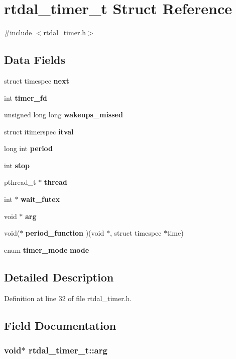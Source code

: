 \section{rtdal\-\_\-timer\-\_\-t Struct Reference}
\label{structrtdal__timer__t}


{\ttfamily \#include $<$rtdal\-\_\-timer.\-h$>$}

\subsection*{Data Fields}
\begin{DoxyCompactItemize}
\item 
struct timespec {\bf next}
\item 
int {\bf timer\-\_\-fd}
\item 
unsigned long long {\bf wakeups\-\_\-missed}
\item 
struct itimerspec {\bf itval}
\item 
long int {\bf period}
\item 
int {\bf stop}
\item 
pthread\-\_\-t $\ast$ {\bf thread}
\item 
int $\ast$ {\bf wait\-\_\-futex}
\item 
void $\ast$ {\bf arg}
\item 
void($\ast$ {\bf period\-\_\-function} )(void $\ast$, struct timespec $\ast$time)
\item 
enum {\bf timer\-\_\-mode} {\bf mode}
\end{DoxyCompactItemize}


\subsection{Detailed Description}


Definition at line 32 of file rtdal\-\_\-timer.\-h.



\subsection{Field Documentation}
\subsubsection[{arg}]{\setlength{\rightskip}{0pt plus 5cm}void$\ast$ rtdal\-\_\-timer\-\_\-t\-::arg}\label{structrtdal__timer__t_ac956640df81f13d496555dc5de7b1c80}


